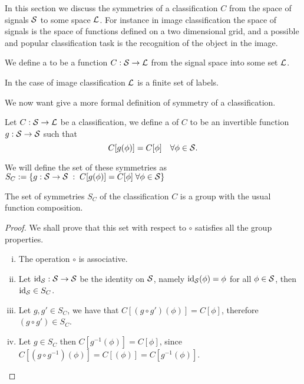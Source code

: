 \documentclass[../3.tex]{subfiles}
\begin{document}
   In this section we discuss the symmetries of a classification $C$ from the space of signals $\mathcal{S}$ to some space $\mathcal{L}$.
   For instance in image classification the space of signals is the space of functions defined on a two dimensional grid,
   and a possible and popular classification task is the recognition of the object in the image.
 

    \begin{defn}
        We define a  to be a function $C : \mathcal{S} \to \mathcal{L}$ from the signal space into some set $\mathcal{L}$.
    \end{defn}

    In the case of image classification $\mathcal{L}$ is a finite set of labels.

    We now want give a more formal definition of symmetry of a classification.

    \begin{defn}
        Let $C : \mathcal{S} \to \mathcal{L}$ be a classification, we define a  of $C$ to be an invertible function
        $g : \mathcal{S} \to \mathcal{S}$ such that 
        \[ C[g(\phi)] = C[\phi] \quad \forall \phi \in \mathcal{S}. \]
    \end{defn}

    We will define the set of these symmetries as $S_C := \{ g : \mathcal{S} \to \mathcal{S} \; : \; C[g(\phi)] = C[\phi] \;  \forall \phi \in \mathcal{S}\}$

    \begin{prop}
        The set of symmetries $S_C$ of the classification $C$ is a group with the usual function composition.
    \end{prop} 
    \begin{proof}
        We shall prove that this set with respect to $\circ$ satisfies all the group properties.
        \begin{enumerate}[(i)]
            \item The operation $\circ$ is associative.
            \item Let $\text{id}_{\mathcal{S}} : \mathcal{S} \to \mathcal{S}$ be the identity on $\mathcal{S}$, namely $\text{id}_{\mathcal{S}}(\phi) = \phi$ for all $\phi \in \mathcal{S}$,
                then $\text{id}_{\mathcal{S}} \in S_C$.
            \item Let $g,g' \in S_C$, we have that $C[(g\circ g')(\phi)] = C[\phi]$, therefore $(g \circ g') \in S_C$.
            \item Let $g \in S_C$ then $C[g^{-1}(\phi)] = C[\phi]$, since $C[(g \circ g^{-1})(\phi)] = C[(\phi)] = C[g^{-1}(\phi)]$. \qedhere
        \end{enumerate}
    \end{proof}
\end{document}
